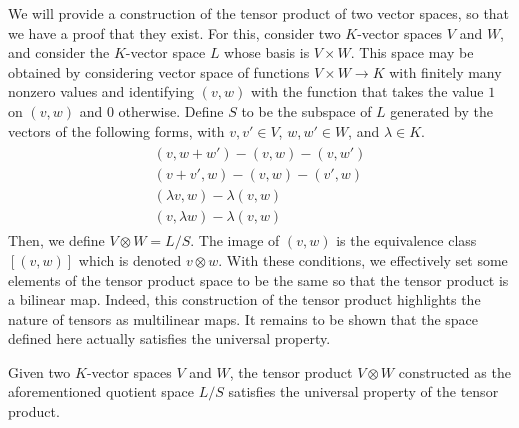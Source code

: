 \documentclass[a4paper,12pt]{article}
\begin{document}
We will provide a construction of the tensor product of two vector spaces, so that we have a proof that they exist.
For this, consider two $K$-vector spaces $V$ and $W$, and consider the $K$-vector space $L$ whose basis is $V \times W$.
This space may be obtained by considering vector space of functions $V \times W \to K$ with finitely many nonzero values and identifying $(v, w)$ with the function that takes the value $1$ on $(v, w)$ and $0$ otherwise.
Define $S$ to be the subspace of $L$ generated by the vectors of the following forms, with $v, v' \in V$, $w, w' \in W$, and $\lambda \in K$.
\begin{align}
    \begin{gathered}
        (v, w + w') - (v, w) - (v, w') \\
        (v + v', w) - (v, w) - (v', w) \\
        (\lambda v, w) - \lambda (v, w) \\
        (v, \lambda w) - \lambda (v, w)
    \end{gathered}
\end{align}
Then, we define $V \otimes W = L/S$.
The image of $(v, w)$ is the equivalence class $[(v, w)]$ which is denoted $v \otimes w$.
With these conditions, we effectively set some elements of the tensor product space to be the same so that the tensor product is a bilinear map.
Indeed, this construction of the tensor product highlights the nature of tensors as multilinear maps.
It remains to be shown that the space defined here actually satisfies the universal property.
\begin{proposition}\label{prop:tensor_product_space_construction_satisfies_universal_property}
    Given two $K$-vector spaces $V$ and $W$, the tensor product $V \otimes W$ constructed as the aforementioned quotient space $L/S$ satisfies the universal property of the tensor product.
\end{proposition}
\end{document}
